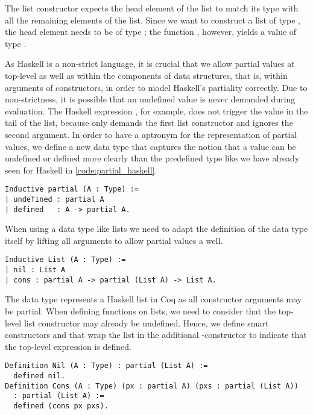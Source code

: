 The list constructor  expects the head element of the list to match its type with all the remaining elements of the list.
Since we want to construct a list of type , the head element needs to be of type ; the function , however, yields a value of type .

As Haskell is a non\--strict language, it is crucial that we allow partial values at top\--level as well as within the components of data structures, that is, within arguments of constructors, in order to model Haskell's partiality correctly.
Due to non\--strictness, it is possible that an undefined value is never demanded during evaluation.
The Haskell expression , for example, does not trigger the  value in the tail of the list, because  only demands the first list constructor and ignores the second argument.
In order to have a aptronym for the representation of partial values, we define a new data type  that captures the notion that a value can be undefined or defined more clearly than the predefined type  like we have already seen for Haskell in \autoref{code:partial_haskell}.

\begin{verbatim}
Inductive partial (A : Type) :=
| undefined : partial A
| defined   : A -> partial A.
\end{verbatim}

When using a data type like lists we need to adapt the definition of the data type itself by lifting all arguments to allow partial values a well.

\begin{verbatim}
Inductive List (A : Type) :=
| nil : List A
| cons : partial A -> partial (List A) -> List A.
\end{verbatim}

The data type  represents a Haskell list in Coq as all constructor arguments may be partial.
When defining functions on lists, we need to consider that the top\--level list constructor may already be undefined.
Hence, we define smart constructors  and  that wrap the list in the additional \--constructor to indicate that the top\--level expression is defined.

\begin{verbatim}
Definition Nil (A : Type) : partial (List A) :=
  defined nil.
Definition Cons (A : Type) (px : partial A) (pxs : partial (List A)) 
  : partial (List A) :=
  defined (cons px pxs).
\end{verbatim}


